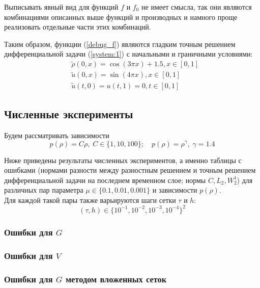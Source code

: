 Выписывать явный вид для функций $f$ и $f_{0}$ не имеет смысла, так они являются комбинациями описанных выше функций и производных и намного проще реализовать отдельные части этих комбинаций.

Таким образом, функции (\ref{debug_f}) являются гладким точным решением дифференциальной задачи (\ref{system:1}) с начальными и граничными условиями:
\begin{equation*}
\begin{aligned}
  & \tilde{\rho}(0,x) = \cos(3 \pi x) + 1.5, x \in [0,1] \\
  & \tilde{u}(0,x) = \sin(4 \pi x), x \in[0,1] \\
  & \tilde{u}(t,0) = u(t,1) = 0, t \in [0,1]
\end{aligned}
\end{equation*}

\subsection{Численные эксперименты}
Будем рассматривать зависимости
$$ 
  p(\rho) = C \rho, \; C \in \{1, 10, 100\} ; \quad
  p(\rho) = \rho^{\gamma}, \; \gamma = 1.4
$$ 

Ниже приведены результаты численных экспериментов, а именно таблицы с ошибками (нормами разности между разностным решением и точным решением дифференциальной задачи на последнем временном слое; нормы $C, L_{2}, W_{2}^{1}$) для различных пар параметра $\mu \in \{0.1, 0.01, 0.001\}$ и зависимости $p(\rho)$. \\

Для каждой такой пары также варьируются шаги сетки $\tau$ и $h$:
$$ (\tau, h) \in \{ 10^{-1}, 10^{-2}, 10^{-3}, 10^{-4} \}^2 $$ 

\newpage

\subsubsection{Ошибки для $G$}


\subsubsection{Ошибки для $V$}


\subsubsection{Ошибки для $G$ методом вложенных сеток}


